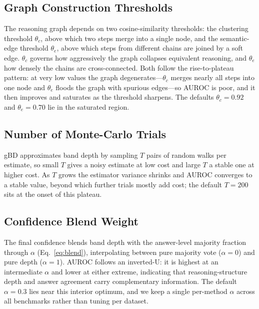 \documentclass[twoside]{article}
\begin{document}
\subsection{Graph Construction Thresholds}
\label{sec:exp:ablation:thresh}

The reasoning graph depends on two cosine-similarity thresholds: the clustering
threshold $\theta_c$, above which two steps merge into a single node, and the
semantic-edge threshold $\theta_e$, above which steps from different chains are
joined by a soft edge. $\theta_c$ governs how aggressively the graph collapses
equivalent reasoning, and $\theta_e$ how densely the chains are cross-connected.
Both follow the rise-to-plateau pattern: at very low values the graph
degenerates---$\theta_c$ merges nearly all steps into one node and $\theta_e$ floods
the graph with spurious edges---so AUROC is poor, and it then improves and saturates
as the threshold sharpens. The defaults $\theta_c{=}0.92$ and $\theta_e{=}0.70$ lie
in the saturated region.

\subsection{Number of Monte-Carlo Trials}
\label{sec:exp:ablation:trials}

gBD approximates band depth by sampling $T$ pairs of random walks per estimate, so
small $T$ gives a noisy estimate at low cost and large $T$ a stable one at higher
cost. As $T$ grows the estimator variance shrinks and AUROC converges to a stable
value, beyond which further trials mostly add cost; the default $T{=}200$ sits at
the onset of this plateau.

\subsection{Confidence Blend Weight}
\label{sec:exp:ablation:alpha}

The final confidence blends band depth with the answer-level majority fraction
through $\alpha$ (Eq.~\eqref{eq:blend}), interpolating between pure majority vote
($\alpha{=}0$) and pure depth ($\alpha{=}1$). AUROC follows an inverted-U: it is
highest at an intermediate $\alpha$ and lower at either extreme, indicating that
reasoning-structure depth and answer agreement carry complementary information. The
default $\alpha{=}0.3$ lies near this interior optimum, and we keep a single
per-method $\alpha$ across all benchmarks rather than tuning per dataset.
\end{document}
